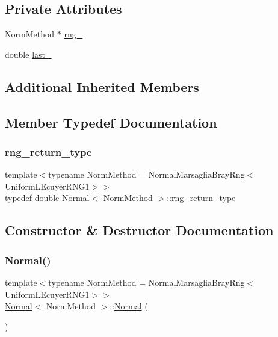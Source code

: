 \subsection*{Private Attributes}
\begin{DoxyCompactItemize}
\item 
Norm\+Method $\ast$ \hyperlink{class_normal_a8abdfd7e9bb63b5ee26e1627829e65b0}{rng\+\_\+}
\item 
double \hyperlink{class_normal_a69f8977c8b8224cf6345b1e2d0d35382}{last\+\_\+}
\end{DoxyCompactItemize}
\subsection*{Additional Inherited Members}


\subsection{Member Typedef Documentation}
\hypertarget{class_normal_a32c30c2173a87e48270b909d9f9be06e}{}\label{class_normal_a32c30c2173a87e48270b909d9f9be06e} 
\subsubsection{\texorpdfstring{rng\+\_\+return\+\_\+type}{rng\_return\_type}}
{\footnotesize\ttfamily template$<$typename Norm\+Method  = Normal\+Marsaglia\+Bray\+Rng$<$\+Uniform\+L\+Ecuyer\+R\+N\+G1$>$$>$ \\
typedef double \hyperlink{class_normal}{Normal}$<$ Norm\+Method $>$\+::\hyperlink{class_normal_a32c30c2173a87e48270b909d9f9be06e}{rng\+\_\+return\+\_\+type}}



\subsection{Constructor \& Destructor Documentation}
\hypertarget{class_normal_abd6aa5f1a9d1619ad8db2600e11e795e}{}\label{class_normal_abd6aa5f1a9d1619ad8db2600e11e795e} 
\subsubsection{\texorpdfstring{Normal()}{Normal()}}
{\footnotesize\ttfamily template$<$typename Norm\+Method  = Normal\+Marsaglia\+Bray\+Rng$<$\+Uniform\+L\+Ecuyer\+R\+N\+G1$>$$>$ \\
\hyperlink{class_normal}{Normal}$<$ Norm\+Method $>$\+::\hyperlink{class_normal}{Normal} (\begin{DoxyParamCaption}{ }\end{DoxyParamCaption})\hspace{0.3cm}{\ttfamily [inline]}}



